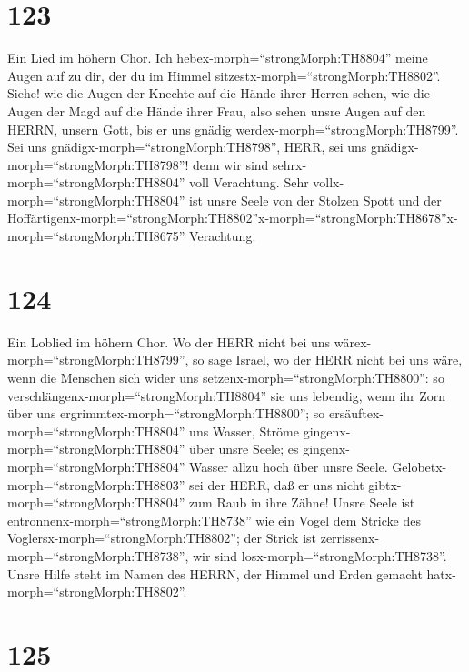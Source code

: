 \hypertarget{section-122}{%
\section{123}\label{section-122}}

 Ein Lied im höhern Chor. Ich
hebex-morph=``strongMorph:TH8804'' meine Augen auf zu dir, der du im
Himmel sitzestx-morph=``strongMorph:TH8802''.  Siehe! wie
die Augen der Knechte auf die Hände ihrer Herren sehen, wie die Augen
der Magd auf die Hände ihrer Frau, also sehen unsre Augen auf den HERRN,
unsern Gott, bis er uns gnädig werdex-morph=``strongMorph:TH8799''.
 Sei uns gnädigx-morph=``strongMorph:TH8798'', HERR, sei uns
gnädigx-morph=``strongMorph:TH8798''! denn wir sind
sehrx-morph=``strongMorph:TH8804'' voll Verachtung.  Sehr
vollx-morph=``strongMorph:TH8804'' ist unsre Seele von der Stolzen Spott
und der
Hoffärtigenx-morph=``strongMorph:TH8802''\textbar x-morph=``strongMorph:TH8678''x-morph=``strongMorph:TH8675''
Verachtung.

\hypertarget{section-123}{%
\section{124}\label{section-123}}

 Ein Loblied im höhern Chor. Wo der HERR nicht bei uns
wärex-morph=``strongMorph:TH8799'', so sage Israel,  wo der
HERR nicht bei uns wäre, wenn die Menschen sich wider uns
setzenx-morph=``strongMorph:TH8800'':  so
verschlängenx-morph=``strongMorph:TH8804'' sie uns lebendig, wenn ihr
Zorn über uns ergrimmtex-morph=``strongMorph:TH8800'';  so
ersäuftex-morph=``strongMorph:TH8804'' uns Wasser, Ströme
gingenx-morph=``strongMorph:TH8804'' über unsre Seele;  es
gingenx-morph=``strongMorph:TH8804'' Wasser allzu hoch über unsre Seele.
 Gelobetx-morph=``strongMorph:TH8803'' sei der HERR, daß er
uns nicht gibtx-morph=``strongMorph:TH8804'' zum Raub in ihre Zähne!
 Unsre Seele ist entronnenx-morph=``strongMorph:TH8738'' wie
ein Vogel dem Stricke des Voglersx-morph=``strongMorph:TH8802''; der
Strick ist zerrissenx-morph=``strongMorph:TH8738'', wir sind
losx-morph=``strongMorph:TH8738''.  Unsre Hilfe steht im
Namen des HERRN, der Himmel und Erden gemacht
hatx-morph=``strongMorph:TH8802''.

\hypertarget{section-124}{%
\section{125}\label{section-124}}

